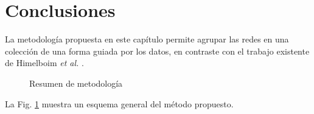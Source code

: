 \section{Conclusiones}

La metodología propuesta en este capítulo permite agrupar las redes en una colección de una forma guiada por los datos, en contraste con el trabajo existente de Himelboim \textit{et al.} \cite{himelboim_classifying_2017}.

\begin{figure}[htbp]
   \centering
   
    \caption{Resumen de metodología}
    \label{fig:masterplan}
\end{figure}


La Fig. \ref{fig:masterplan} muestra un esquema general del método propuesto. 


